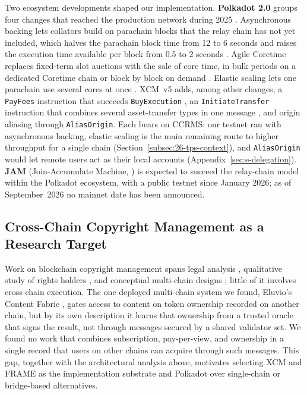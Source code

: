 Two ecosystem developments shaped our implementation. \textbf{Polkadot 2.0} groups four changes that reached the production network during 2025 \citep{parityUpgrade2025, polkadotNetwork2025}. Asynchronous backing lets collators build on parachain blocks that the relay chain has not yet included, which halves the parachain block time from 12 to 6 seconds and raises the execution time available per block from 0.5 to 2 seconds \citep{polkadotWikiAsyncBacking}. Agile Coretime replaces fixed-term slot auctions with the sale of core time, in bulk periods on a dedicated Coretime chain or block by block on demand \citep{woodRFC1}. Elastic scaling lets one parachain use several cores at once \citep{paritySdkElasticScaling}. XCM~v5 adds, among other changes, a \texttt{PayFees} instruction that succeeds \texttt{BuyExecution} \citep{aguirreRFC105}, an \texttt{InitiateTransfer} instruction that combines several asset-transfer types in one message \citep{catangiuRFC100}, and origin aliasing through \texttt{AliasOrigin}. Each bears on CCRMS: our testnet ran with asynchronous backing, elastic scaling is the main remaining route to higher throughput for a single chain (Section~\ref{subsec:26-tps-context}), and \texttt{AliasOrigin} would let remote users act as their local accounts (Appendix~\ref{sec:e-delegation}). \textbf{JAM} (Join-Accumulate Machine, \citet{wood2024}) is expected to succeed the relay-chain model within the Polkadot ecosystem, with a public testnet since January 2026; as of September~2026 no mainnet date has been announced.

\subsection{Cross-Chain Copyright Management as a Research Target}\label{subsec:cross-chain-copyright-research}

Work on blockchain copyright management spans legal analysis \citep{buzu2021, mareckova2024}, qualitative study of rights holders \citep{oreroEtAl2023}, and conceptual multi-chain designs \citep{xieLiu2022, xieTang2024a}; little of it involves cross-chain execution. The one deployed multi-chain system we found, Eluvio's Content Fabric \citep{munsonEtAl2022}, gates access to content on token ownership recorded on another chain, but by its own description it learns that ownership from a trusted oracle that signs the result, not through messages secured by a shared validator set. We found no work that combines subscription, pay-per-view, and ownership in a single record that users on other chains can acquire through such messages. This gap, together with the architectural analysis above, motivates selecting XCM and FRAME as the implementation substrate and Polkadot over single-chain or bridge-based alternatives.

